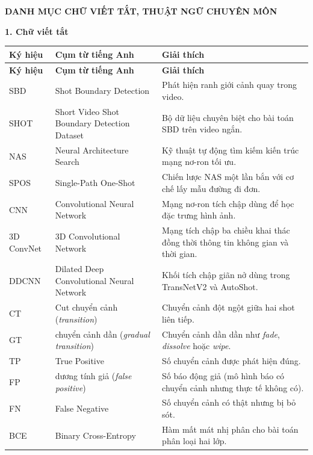 {}

\begin{center}
{\large\bfseries{DANH MỤC CHỮ VIẾT TẮT, THUẬT NGỮ CHUYÊN MÔN}}
\end{center}

\vspace{1em}

\noindent\textbf{1. Chữ viết tắt}

{
\small
\renewcommand{\arraystretch}{1.2}
\begin{longtable}{L{2.6cm}L{4.8cm}L{6.3cm}}
\toprule
\textbf{Ký hiệu} & \textbf{Cụm từ tiếng Anh} & \textbf{Giải thích} \\
\midrule
\endfirsthead
\toprule
\textbf{Ký hiệu} & \textbf{Cụm từ tiếng Anh} & \textbf{Giải thích} \\
\midrule
\endhead
SBD & Shot Boundary Detection & Phát hiện ranh giới cảnh quay trong video. \\
SHOT & Short Video Shot Boundary Detection Dataset & Bộ dữ liệu chuyên biệt cho bài toán SBD trên video ngắn. \\
NAS & Neural Architecture Search & Kỹ thuật tự động tìm kiếm kiến trúc mạng nơ-ron tối ưu. \\
SPOS & Single-Path One-Shot & Chiến lược NAS một lần bắn với cơ chế lấy mẫu đường đi đơn. \\
CNN & Convolutional Neural Network & Mạng nơ-ron tích chập dùng để học đặc trưng hình ảnh. \\
3D ConvNet & 3D Convolutional Network & Mạng tích chập ba chiều khai thác đồng thời thông tin không gian và thời gian. \\
DDCNN & Dilated Deep Convolutional Neural Network & Khối tích chập giãn nở dùng trong TransNetV2 và AutoShot. \\
CT & Cut chuyển cảnh (\textit{transition}) & Chuyển cảnh đột ngột giữa hai shot liên tiếp. \\
GT & chuyển cảnh dần (\textit{gradual transition}) & Chuyển cảnh dần dần như \textit{fade}, \textit{dissolve} hoặc \textit{wipe}. \\
TP & True Positive & Số chuyển cảnh được phát hiện đúng. \\
FP & dương tính giả (\textit{false positive}) & Số báo động giả (mô hình báo có chuyển cảnh nhưng thực tế không có). \\
FN & False Negative & Số chuyển cảnh có thật nhưng bị bỏ sót. \\
BCE & Binary Cross-Entropy & Hàm mất mát nhị phân cho bài toán phân loại hai lớp. \\

\end{longtable}}

